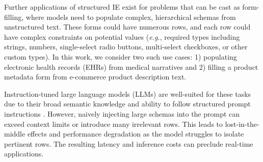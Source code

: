 \documentclass[11pt]{article}
\begin{document}
Further applications of structured IE exist for problems that can be cast as form-filling, 
where models need to populate complex, hierarchical schemas from unstructured text. 
These forms could have numerous rows, and each row could have complex constraints on potential values (\textit{e.g.}, required types including strings, numbers, single-select radio buttons, multi-select checkboxes, or other custom types). In this work, we consider two such use cases: 
1) populating electronic health records (EHRs) from medical narratives and 2) filling a product metadata form from e-commerce product description text.

Instruction-tuned large language models (LLMs) are well-suited for these tasks due to their broad semantic knowledge \cite{Singhal2023} and ability to follow structured prompt instructions \cite{LIU2024103809}.
However, naively injecting large schemas into the prompt can exceed context limits or introduce many irrelevant rows. This leads to lost-in-the-middle effects \cite{liu-etal-2024-lost} and performance degradation as the model struggles to isolate pertinent rows. The resulting latency and inference costs can preclude real-time applications.
\end{document}
